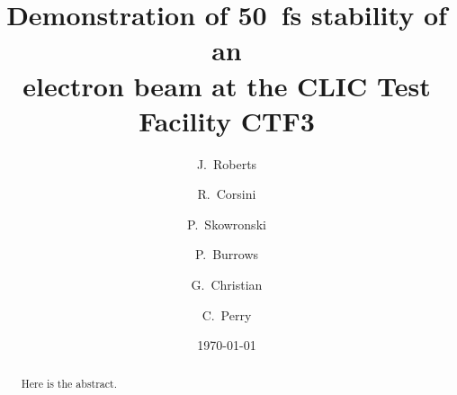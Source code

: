 \documentclass[%
 reprint,
 amsmath,amssymb,
 aps,
]{revtex4-1}
\begin{document}

\title{Demonstration of 50~fs stability of an \\ electron beam at the CLIC Test Facility CTF3}%

\author{J.~Roberts}
\author{R.~Corsini}
\author{P.~Skowronski}%
%


\author{P.~Burrows}
\author{G.~Christian}
\author{C.~Perry}
%


\date{\today}%

\begin{abstract}
Here is the abstract.
\end{abstract}

\maketitle
\end{document}
